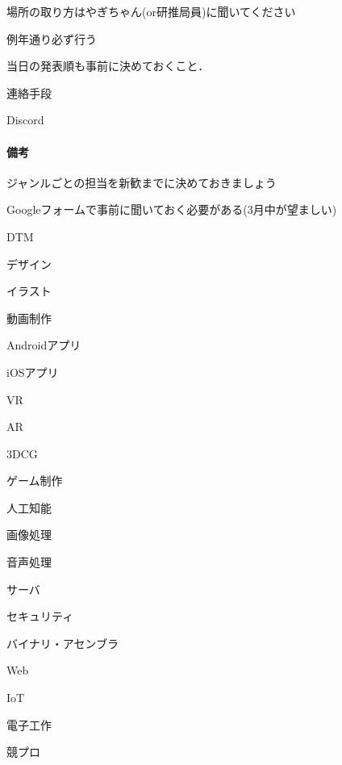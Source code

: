                 場所の取り方はやぎちゃん(or研推局員)に聞いてください
                
            例年通り必ず行う
            
            当日の発表順も事前に決めておくこと．
             
        連絡手段
        
            Discord

 \paragraph*{備考}
    ジャンルごとの担当を新歓までに決めておきましょう
    
    Googleフォームで事前に聞いておく必要がある(3月中が望ましい)
    
        DTM

        デザイン
        
        イラスト
        
        動画制作
        
        Androidアプリ
        
        iOSアプリ
        
        VR
        
        AR
        
        3DCG
        
        ゲーム制作
        
        人工知能
        
        画像処理
        
        音声処理
        
        サーバ
        
        セキュリティ

        バイナリ・アセンブラ
        
        Web
        
        IoT
        
        電子工作
        
        競プロ


        
                    
                
        

    

    

